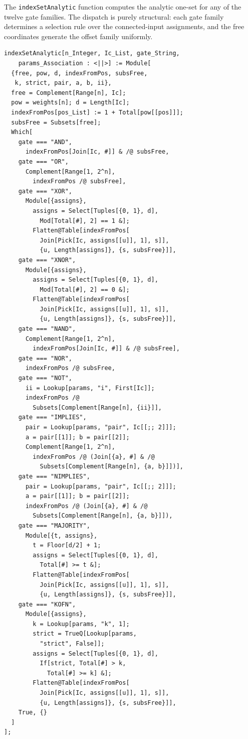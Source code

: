 \documentclass[11pt]{article}
\begin{document}
The \texttt{indexSetAnalytic} function computes the analytic one-set for any
of the twelve gate families.  The dispatch is purely structural: each gate
family determines a selection rule over the connected-input assignments,
and the free coordinates generate the offset family uniformly.

\begin{lstlisting}[style=MathematicaStyle,caption={Complete dispatch of \texttt{indexSetAnalytic} for all gate families.}]
indexSetAnalytic[n_Integer, Ic_List, gate_String,
    params_Association : <||>] := Module[
  {free, pow, d, indexFromPos, subsFree,
   k, strict, pair, a, b, ii},
  free = Complement[Range[n], Ic];
  pow = weights[n]; d = Length[Ic];
  indexFromPos[pos_List] := 1 + Total[pow[[pos]]];
  subsFree = Subsets[free];
  Which[
    gate === "AND",
      indexFromPos[Join[Ic, #]] & /@ subsFree,
    gate === "OR",
      Complement[Range[1, 2^n],
        indexFromPos /@ subsFree],
    gate === "XOR",
      Module[{assigns},
        assigns = Select[Tuples[{0, 1}, d],
          Mod[Total[#], 2] == 1 &];
        Flatten@Table[indexFromPos[
          Join[Pick[Ic, assigns[[u]], 1], s]],
          {u, Length[assigns]}, {s, subsFree}]],
    gate === "XNOR",
      Module[{assigns},
        assigns = Select[Tuples[{0, 1}, d],
          Mod[Total[#], 2] == 0 &];
        Flatten@Table[indexFromPos[
          Join[Pick[Ic, assigns[[u]], 1], s]],
          {u, Length[assigns]}, {s, subsFree}]],
    gate === "NAND",
      Complement[Range[1, 2^n],
        indexFromPos[Join[Ic, #]] & /@ subsFree],
    gate === "NOR",
      indexFromPos /@ subsFree,
    gate === "NOT",
      ii = Lookup[params, "i", First[Ic]];
      indexFromPos /@
        Subsets[Complement[Range[n], {ii}]],
    gate === "IMPLIES",
      pair = Lookup[params, "pair", Ic[[;; 2]]];
      a = pair[[1]]; b = pair[[2]];
      Complement[Range[1, 2^n],
        indexFromPos /@ (Join[{a}, #] & /@
          Subsets[Complement[Range[n], {a, b}]])],
    gate === "NIMPLIES",
      pair = Lookup[params, "pair", Ic[[;; 2]]];
      a = pair[[1]]; b = pair[[2]];
      indexFromPos /@ (Join[{a}, #] & /@
        Subsets[Complement[Range[n], {a, b}]]),
    gate === "MAJORITY",
      Module[{t, assigns},
        t = Floor[d/2] + 1;
        assigns = Select[Tuples[{0, 1}, d],
          Total[#] >= t &];
        Flatten@Table[indexFromPos[
          Join[Pick[Ic, assigns[[u]], 1], s]],
          {u, Length[assigns]}, {s, subsFree}]],
    gate === "KOFN",
      Module[{assigns},
        k = Lookup[params, "k", 1];
        strict = TrueQ[Lookup[params,
          "strict", False]];
        assigns = Select[Tuples[{0, 1}, d],
          If[strict, Total[#] > k,
            Total[#] >= k] &];
        Flatten@Table[indexFromPos[
          Join[Pick[Ic, assigns[[u]], 1], s]],
          {u, Length[assigns]}, {s, subsFree}]],
    True, {}
  ]
];
\end{lstlisting}
\end{document}
